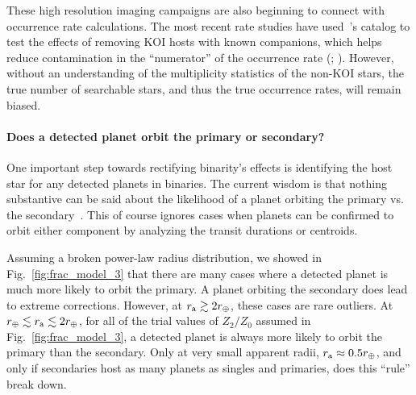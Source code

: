 \documentclass[12pt,modern]{aastex61}
\renewcommand{\a}{_{\rm a}}
\begin{document}
These high resolution imaging campaigns are also beginning to connect with
occurrence rate calculations.
The most recent rate studies have used~\citet{furlan_kepler_2017}'s 
catalog to test the effects of removing KOI hosts with known companions, which 
helps reduce contamination in the ``numerator'' of 
the occurrence rate (\citealt{fulton_california-_2017}; 
\citealt{petigura_CKS_2017}).
However, without an understanding of the multiplicity statistics of the 
non-KOI stars, the true number of searchable stars, and thus the true 
occurrence rates, will remain biased.

\paragraph{Does a detected planet orbit the primary or secondary?}
One important step towards rectifying binarity's effects is identifying the 
host star for any detected planets in binaries.
The current 
wisdom is that nothing substantive can be said about the 
likelihood of a planet orbiting the primary vs. the 
secondary~\citep[\textit{e.g.},][]{ciardi_understanding_2015,ziegler_robo-ao_2017}.
This of course ignores cases when planets can be confirmed to orbit either 
component by analyzing the transit durations or centroids.

Assuming a broken power-law radius distribution, we showed in 
Fig.~\ref{fig:frac_model_3} that there are many cases where a detected planet 
is much more likely to orbit the primary.
A planet orbiting the secondary does lead to extreme corrections.
However, at $r\a \gtrsim 2r_\oplus$, these cases are rare outliers.
At $r_\oplus \lesssim r\a \lesssim 2r_\oplus$, for all of the trial values of 
$Z_2/Z_0$ assumed in Fig.~\ref{fig:frac_model_3}, a detected planet is always 
more likely to orbit the primary than the secondary.
Only at very small apparent radii, $r\a \approx 0.5r_\oplus$, and only if 
secondaries host as many planets as singles and primaries, does this ``rule'' 
break down.
\end{document}
